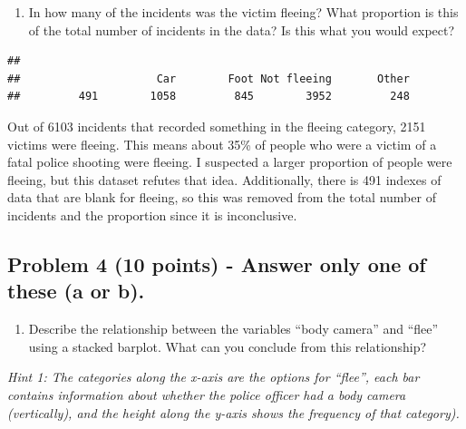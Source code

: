 \documentclass[
]{article}
\newenvironment{Shaded}{\begin{snugshade}}{\end{snugshade}}
\newcommand{\FunctionTok}[1]{\textcolor[rgb]{0.00,0.00,0.00}{#1}}
\newcommand{\NormalTok}[1]{#1}
\newcommand{\SpecialCharTok}[1]{\textcolor[rgb]{0.00,0.00,0.00}{#1}}
\providecommand{\tightlist}{%
  \setlength{\itemsep}{0pt}\setlength{\parskip}{0pt}}
\begin{document}
\begin{enumerate}
\def\labelenumi{\alph{enumi}.}
\setcounter{enumi}{1}
\tightlist
\item
  In how many of the incidents was the victim fleeing? What proportion
  is this of the total number of incidents in the data? Is this what you
  would expect?
\end{enumerate}

\begin{Shaded}
\end{Shaded}

\begin{verbatim}
## 
##                     Car        Foot Not fleeing       Other 
##         491        1058         845        3952         248
\end{verbatim}

Out of 6103 incidents that recorded something in the fleeing category,
2151 victims were fleeing. This means about 35\% of people who were a
victim of a fatal police shooting were fleeing. I suspected a larger
proportion of people were fleeing, but this dataset refutes that idea.
Additionally, there is 491 indexes of data that are blank for fleeing,
so this was removed from the total number of incidents and the
proportion since it is inconclusive.

\hypertarget{problem-4-10-points---answer-only-one-of-these-a-or-b.}{%
\subsection{Problem 4 (10 points) - Answer only one of these (a or
b).}\label{problem-4-10-points---answer-only-one-of-these-a-or-b.}}

\begin{enumerate}
\def\labelenumi{\alph{enumi}.}
\tightlist
\item
  Describe the relationship between the variables ``body camera'' and
  ``flee'' using a stacked barplot. What can you conclude from this
  relationship?
\end{enumerate}

\emph{Hint 1: The categories along the x-axis are the options for
``flee'', each bar contains information about whether the police officer
had a body camera (vertically), and the height along the y-axis shows
the frequency of that category).}
\end{document}
